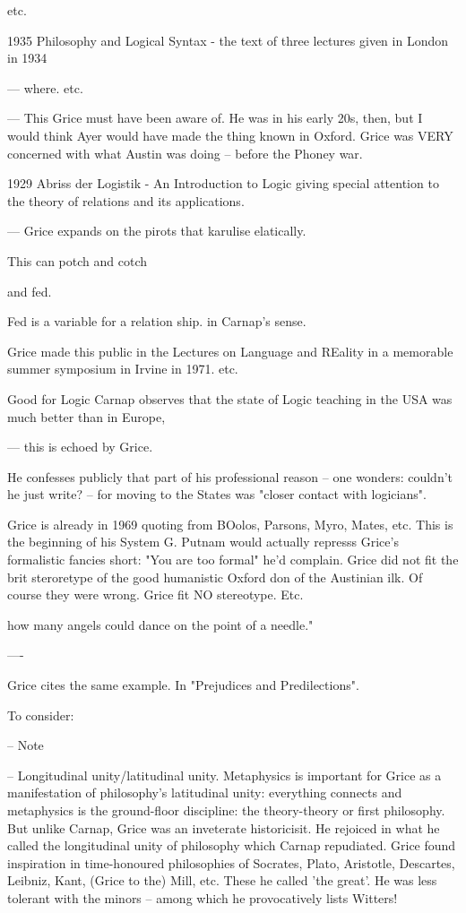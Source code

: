 \documentclass[10pt,titlepage]{book}
\begin{document}
etc.

1935 Philosophy and Logical Syntax - the text of  three lectures given in 
London in 1934  

--- where. etc.
 
---
This Grice must have been aware of. He was in his early 20s, then, but I  
would think Ayer would have made the thing known in Oxford. Grice was VERY  
concerned with what Austin was doing -- before the Phoney war.

1929 Abriss der Logistik - An Introduction to Logic giving special  
attention to the theory of relations and its applications.
 
 
--- Grice expands on the pirots that karulise elatically.
 
This can potch and cotch
 
and fed.
 
Fed is a variable for a relation ship. in Carnap's sense.
 
Grice made this public in the Lectures on Language and REality in a  
memorable summer symposium in Irvine in 1971. etc.

Good for Logic
Carnap observes that the state of Logic teaching in  the USA was much 
better than in Europe, 
 
--- this is echoed by Grice.
 
He confesses publicly that part of his professional reason -- one wonders:  
couldn't he just write? -- for moving to the States was "closer contact 
with  logicians".
 
Grice is already in 1969 quoting from BOolos, Parsons, Myro, Mates, etc.  
This is the beginning of his System G. Putnam would actually represss Grice's 
 formalistic fancies short: "You are too formal" he'd complain. Grice did 
not fit  the brit steroretype of the good humanistic Oxford don of the 
Austinian ilk. Of  course they were wrong. Grice fit NO stereotype. Etc.

how many angels could dance on the point of a needle." 
 
----
 
Grice cites the same example. In "Prejudices and Predilections".
 
To consider:
 
-- Note
 
-- Longitudinal unity/latitudinal unity. Metaphysics is important for Grice 
 as a manifestation of philosophy's latitudinal unity: everything connects 
and  metaphysics is the ground-floor discipline: the theory-theory or first  
philosophy. But unlike Carnap, Grice was an inveterate historicisit. He 
rejoiced  in what he called the longitudinal unity of philosophy which Carnap 
repudiated.  Grice found inspiration in time-honoured philosophies of 
Socrates, Plato,  Aristotle, Descartes, Leibniz, Kant, (Grice to the) Mill, etc. 
These he called  'the great'. He was less tolerant with the minors -- among 
which he  provocatively lists Witters!
 
\end{document}
